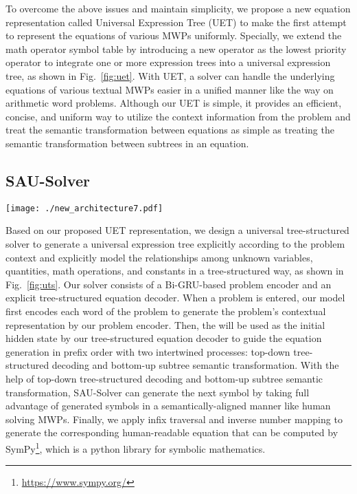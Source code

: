 \documentclass[11pt,a4paper]{article}
\begin{document}
To overcome the above issues and maintain simplicity, we propose a new equation representation called Universal Expression Tree (UET) to make the first attempt to represent the equations of various MWPs uniformly. Specially, we extend the math operator symbol table by introducing a new operator  as the lowest priority operator to integrate one or more expression trees into a universal expression tree, as shown in Fig.~\ref{fig:uet}. With UET, a solver can handle the underlying equations of various textual MWPs easier in a unified manner like the way on arithmetic word problems. Although our UET is simple, it provides an efficient, concise, and uniform way to utilize the context information from the problem and treat the semantic transformation between equations as simple as treating the semantic transformation between subtrees in an equation. 
\subsection{SAU-Solver}
\begin{figure*}[htbp] \centerline{\texttt{[image: ./new\_architecture7.pdf]}}
	\caption{An overview of our SAU-Solver. When a problem preprocessed by number mapping and replacement is entered, our problem encoder encodes the problem text as context representation. Then our equation decoder generates an expression tree explicitly in pre-order traversal for the problem according to the context representation. Finally, infix traversal and inverse number mapping are applied to generate the corresponding equation.}
	\label{fig:uts}
\end{figure*}
Based on our proposed UET representation, we design a universal tree-structured solver to generate a universal expression tree explicitly according to the problem context and explicitly model the relationships among unknown variables, quantities, math operations, and constants in a tree-structured way, as shown in Fig.~\ref{fig:uts}. Our solver consists of a Bi-GRU-based problem encoder and an explicit tree-structured equation decoder. When a problem is entered, our model first encodes each word of the problem to generate the problem's contextual representation  by our problem encoder. Then, the  will be used as the initial hidden state by our tree-structured equation decoder to guide the equation generation in prefix order with two intertwined processes: top-down tree-structured decoding and bottom-up subtree semantic transformation. With the help of top-down tree-structured decoding and bottom-up subtree semantic transformation, SAU-Solver can generate the next symbol by taking full advantage of generated symbols in a semantically-aligned manner like human solving MWPs. Finally, we apply infix traversal and inverse number mapping to generate the corresponding human-readable equation that can be computed by SymPy\footnote{\url{https://www.sympy.org/}}, which is a python library for symbolic mathematics.
\end{document}
